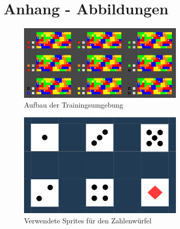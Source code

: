 
\clearpage
\chapter{Anhang - Abbildungen}


\begin{figure}[!htb]
	\centering
	\includegraphics[width=0.7\textwidth]{Bilder/Environment.png}
	\caption{Aufbau der Trainingsumgebung}
    \label{fig:Environment}
\end{figure}

\begin{figure}[!htb]
	\centering
	\includegraphics[width=0.7\textwidth]{Bilder/Sprites.png}
	\caption{Verwendete Sprites für den Zahlenwürfel}
    \label{fig:NumberSprites}
\end{figure}


